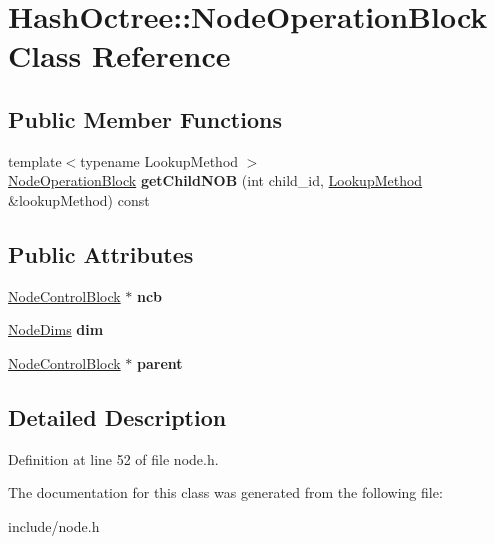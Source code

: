 \hypertarget{class_hash_octree_1_1_node_operation_block}{}\section{Hash\+Octree\+::Node\+Operation\+Block Class Reference}
\label{class_hash_octree_1_1_node_operation_block}
\subsection*{Public Member Functions}
\begin{DoxyCompactItemize}
\item 
\mbox{\label{class_hash_octree_1_1_node_operation_block_a217f08cbe440f1b2f3edf49b9aad078a}} 
{\footnotesize template$<$typename Lookup\+Method $>$ }\\\mbox{\hyperlink{class_hash_octree_1_1_node_operation_block}{Node\+Operation\+Block}} {\bfseries get\+Child\+N\+OB} (int child\+\_\+id, \mbox{\hyperlink{class_hash_octree_1_1_lookup_method}{Lookup\+Method}} \&lookup\+Method) const
\end{DoxyCompactItemize}
\subsection*{Public Attributes}
\begin{DoxyCompactItemize}
\item 
\mbox{\label{class_hash_octree_1_1_node_operation_block_a52271de267125129457c47e9d4af40e3}} 
\mbox{\hyperlink{class_hash_octree_1_1_node_control_block}{Node\+Control\+Block}} $\ast$ {\bfseries ncb}
\item 
\mbox{\label{class_hash_octree_1_1_node_operation_block_a0bd05ede83039957325655369d7f41ac}} 
\mbox{\hyperlink{class_hash_octree_1_1_node_dims}{Node\+Dims}} {\bfseries dim}
\item 
\mbox{\label{class_hash_octree_1_1_node_operation_block_a6fd82cb0f913f524375454f47534a5b9}} 
\mbox{\hyperlink{class_hash_octree_1_1_node_control_block}{Node\+Control\+Block}} $\ast$ {\bfseries parent}
\end{DoxyCompactItemize}


\subsection{Detailed Description}


Definition at line 52 of file node.\+h.



The documentation for this class was generated from the following file\+:\begin{DoxyCompactItemize}
\item 
include/node.\+h\end{DoxyCompactItemize}
